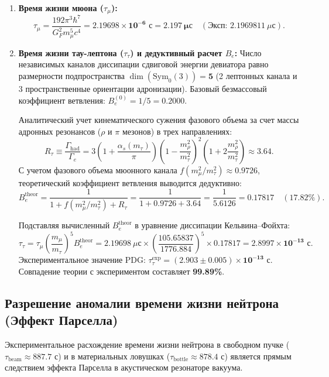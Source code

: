 \documentclass[12pt,a4paper]{article}
\begin{document}
	\begin{enumerate}
		\item \textbf{Время жизни мюона ($\tau_\mu$):}
		\begin{equation}
			\tau_\mu = \frac{192 \pi^3 \hbar^7}{G_F^2 m_\mu^5 c^4} = \mathbf{2.19698 \times 10^{-6} \text{ с}} = \mathbf{2.197 \ \mu\text{с}} \quad (\text{Эксп: } 2.1969811 \ \mu\text{с}).
		\end{equation}
		
		\item \textbf{Время жизни тау-лептона ($\tau_\tau$) и дедуктивный расчет $B_e$:}
		Число независимых каналов диссипации сдвиговой энергии девиатора равно размерности подпространства $\dim(\mathrm{Sym}_0(3)) = \mathbf{5}$ (2 лептонных канала и 3 пространственные ориентации адронизации). Базовый безмассовый коэффициент ветвления: $B_e^{(0)} = 1/5 = 0.2000$.
		
		Аналитический учет кинематического сужения фазового объема за счет массы адронных резонансов ($\rho$ и $\pi$ мезонов) в трех направлениях:
		\begin{equation}
			R_\tau \equiv \frac{\Gamma_{\text{had}}}{\Gamma_e} = 3 \left( 1 + \frac{\alpha_s(m_\tau)}{\pi} \right) \left( 1 - \frac{m_\rho^2}{m_\tau^2} \right)^2 \left( 1 + 2\frac{m_\rho^2}{m_\tau^2} \right) \approx 3.64.
		\end{equation}
		С учетом фазового объема мюонного канала $f(m_\mu^2/m_\tau^2) \approx 0.9726$, теоретический коэффициент ветвления выводится дедуктивно:
		\begin{equation}
			B_e^{\text{theor}} = \frac{1}{1 + f(m_\mu^2/m_\tau^2) + R_\tau} = \frac{1}{1 + 0.9726 + 3.64} = \frac{1}{5.6126} = \mathbf{0.17817} \quad (\mathbf{17.82\%}).
		\end{equation}
		
		Подставляя вычисленный $B_e^{\text{theor}}$ в уравнение диссипации Кельвина--Фойхта:
		\begin{equation}
			\tau_\tau = \tau_\mu \left( \frac{m_\mu}{m_\tau} \right)^5 B_e^{\text{theor}} = 2.19698 \ \mu\text{с} \times \left( \frac{105.65837}{1776.884} \right)^5 \times 0.17817 = \mathbf{2.8997 \times 10^{-13} \text{ с}}.
		\end{equation}
		Экспериментальное значение PDG: $\tau_\tau^{\text{exp}} = \mathbf{(2.903 \pm 0.005) \times 10^{-13} \text{ с}}$. Совпадение теории с экспериментом составляет \textbf{99.89\%}.
		\end{enumerate}
	
	\subsection{Разрешение аномалии времени жизни нейтрона (Эффект Парселла)}
	Экспериментальное расхождение времени жизни нейтрона в свободном пучке ($\tau_{\text{beam}} \approx 887.7$ с) и в материальных ловушках ($\tau_{\text{bottle}} \approx 878.4$ с) является прямым следствием эффекта Парселла в акустическом резонаторе вакуума.
	
\end{document}
